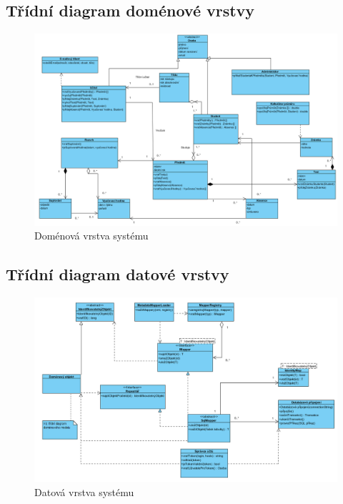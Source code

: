 \documentclass[a4paper,10pt,titlepage]{article}
\begin{document}
			\subsection{Třídní diagram doménové vrstvy}
				\begin{figure}[H]
					\centering
							\includegraphics[width=\textwidth]{vis_class_diagram_domain}
					\caption{Doménová vrstva systému}
				\end{figure}
			\subsection{Třídní diagram datové vrstvy}
				\begin{figure}[H]
					\centering
							\includegraphics[width=\textwidth]{vis_class_diagram_data}
					\caption{Datová vrstva systému}
				\end{figure}
\end{document}

